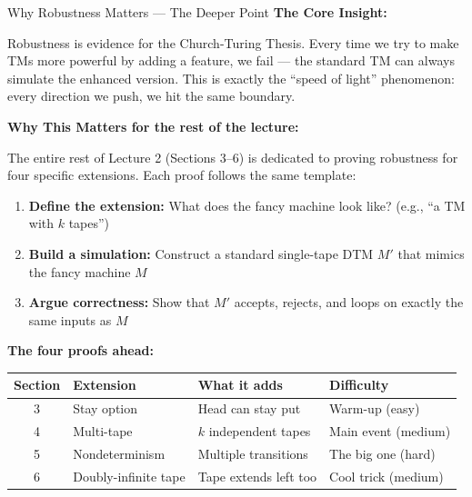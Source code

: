 \begin{conceptbox}{Why Robustness Matters --- The Deeper Point}
\textbf{The Core Insight:}

Robustness is evidence for the Church-Turing Thesis. Every time we try to make
TMs more powerful by adding a feature, we fail --- the standard TM can always
simulate the enhanced version. This is exactly the ``speed of light'' phenomenon:
every direction we push, we hit the same boundary.

\textbf{Why This Matters for the rest of the lecture:}

The entire rest of Lecture 2 (Sections 3--6) is dedicated to proving robustness
for four specific extensions. Each proof follows the same template:

\begin{enumerate}[nosep]
\item \textbf{Define the extension:} What does the fancy machine look like?
  (e.g., ``a TM with $k$ tapes'')
\item \textbf{Build a simulation:} Construct a standard single-tape DTM $M'$
  that mimics the fancy machine $M$
\item \textbf{Argue correctness:} Show that $M'$ accepts, rejects, and loops on
  exactly the same inputs as $M$
\end{enumerate}

\textbf{The four proofs ahead:}

\begin{center}
\renewcommand{\arraystretch}{1.3}
\begin{tabular}{clll}
\toprule
\textbf{Section} & \textbf{Extension} & \textbf{What it adds} & \textbf{Difficulty} \\
\midrule
3 & Stay option & Head can stay put & Warm-up (easy) \\
4 & Multi-tape & $k$ independent tapes & Main event (medium) \\
5 & Nondeterminism & Multiple transitions & The big one (hard) \\
6 & Doubly-infinite tape & Tape extends left too & Cool trick (medium) \\
\bottomrule
\end{tabular}
\end{center}

\end{conceptbox}


